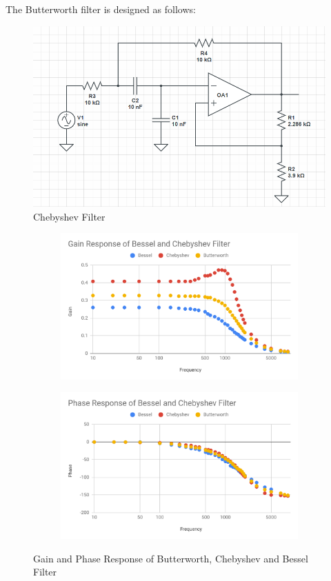 \documentclass[12pt]{article}
\begin{document}
		The Butterworth filter is designed as follows:\\
		\begin{figure}[h!]
			\centering
			\includegraphics[width=\columnwidth]{butterworth}
			\caption{Chebyshev Filter}
		\end{figure}
		\newpage
		\begin{figure}[h!]
			\centering
			\begin{subfigure}[b]{0.49\textwidth}
				\centering
				\includegraphics[width=\textwidth]{butterworth_gain}
			\end{subfigure}
			\hfill
			\begin{subfigure}[b]{0.49\textwidth}
				\centering
				\includegraphics[width=\textwidth]{butterworth_phase}
			\end{subfigure}
			\caption{Gain and Phase Response of Butterworth, Chebyshev and Bessel Filter}
		\end{figure}
\end{document}
